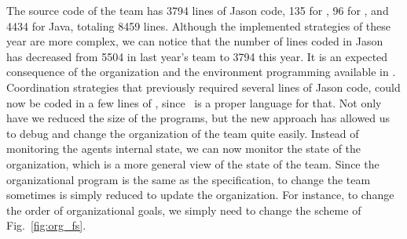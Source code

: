 The source code of the team has 3794 lines of Jason code, 135 for \moise, 96 for \cartago, and 4434 for Java, totaling 8459 lines. Although the implemented strategies of these year are more complex, we can notice that the number of lines coded in Jason has decreased from 5504 in last year's team to 3794 this year. It is an expected consequence of the organization and the environment programming available in \jacamo. Coordination strategies that previously required several lines of Jason code, could now be coded in a few lines of \moise, since \moise\ is a proper language for that.  Not only have we reduced the size of the programs, but the new approach has allowed us to debug and change the organization of the team quite easily. Instead of monitoring the agents internal state, we can now monitor the state of the organization, which is a more general view of the state of the team. Since the organizational program is the same as the specification, to change the team sometimes is simply reduced to update the organization. For instance, to change the order of organizational goals, we simply need to change the scheme of Fig.~\ref{fig:org_fs}.